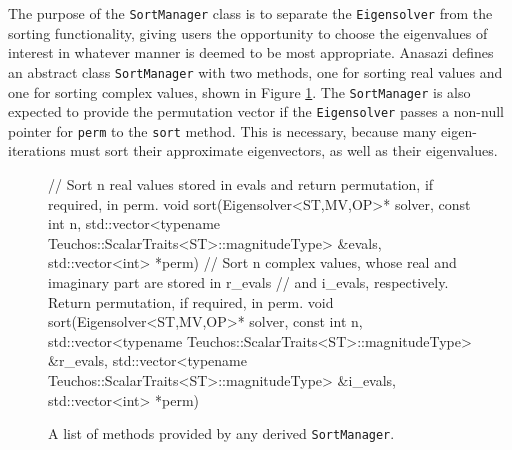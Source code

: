 \documentclass[acmtoms,acmnow]{acmtrans2m}
\newcommand{\aspace}[1]{\texttt{#1}}
\begin{document}
The purpose of the \aspace{SortManager} class is to separate the \aspace{Eigensolver} from
the sorting functionality, giving users the opportunity to choose the eigenvalues of
interest in whatever manner is deemed to be most appropriate. Anasazi defines an abstract
class \aspace{SortManager} with two methods, one for sorting real values and one for
sorting complex values, shown in Figure \ref{fig:sort}.  The \aspace{SortManager} is also
expected to provide the permutation vector if the \aspace{Eigensolver} passes a non-null
pointer for \verb!perm! to the \aspace{sort} method.  This is necessary, because many
eigen-iterations must sort their approximate eigenvectors, as well as their eigenvalues.

\begin{figure}[htb]
\begin{center}
\begin{boxedverbatim}
// Sort n real values stored in evals and return permutation, if required, in perm.
void sort(Eigensolver<ST,MV,OP>* solver, 
          const int n, 
          std::vector<typename Teuchos::ScalarTraits<ST>::magnitudeType> &evals,
          std::vector<int> *perm) 
// Sort n complex values, whose real and imaginary part are stored in r_evals 
//   and i_evals, respectively. Return permutation, if required, in perm.
void sort(Eigensolver<ST,MV,OP>* solver, 
          const int n, 
          std::vector<typename Teuchos::ScalarTraits<ST>::magnitudeType> &r_evals, 
          std::vector<typename Teuchos::ScalarTraits<ST>::magnitudeType> &i_evals, 
          std::vector<int> *perm)
\end{boxedverbatim}
\end{center}
\caption{A list of methods provided by any derived \aspace{SortManager}.} \label{fig:sort}
\end{figure}
\end{document}
